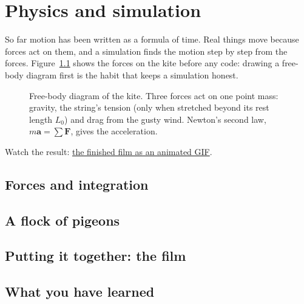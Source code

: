 \chapter{Physics and simulation}\label{ch:physics}

So far motion has been written as a formula of time. Real things move because forces act on them, and a simulation finds the motion step by step from the forces. Figure~\ref{fig:fbd} shows the forces on the kite before any code: drawing a free-body diagram first is the habit that keeps a simulation honest.

\begin{figure}[H]\centering
{}
\caption{Free-body diagram of the kite. Three forces act on one point mass: gravity, the string's tension (only when stretched beyond its rest length $L_0$) and drag from the gusty wind. Newton's second law, $m\mathbf{a}=\sum\mathbf{F}$, gives the acceleration.}\label{fig:fbd}
\end{figure}

Watch the result: \href{https://ahmadammar.github.io/files/pixel-animation/badshahi_film.gif}{the finished film as an animated GIF}.

\section{Forces and integration}

\section{A flock of pigeons}

\section{Putting it together: the film}

\section{What you have learned}

